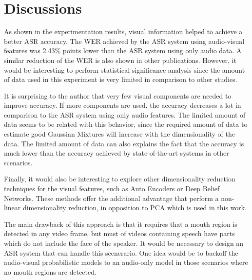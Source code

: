\documentclass[12pt,a4paper]{article}
\begin{document}
\section{Discussions}
As shown in the experimentation results, visual information helped to achieve a better ASR accuracy. The WER achieved by the ASR system using audio-visual features was 2.43\% points lower than the ASR system using only audio data. A similar reduction of the WER is also shown in other publications\cite{neti2000audio, dupont2000audio, hazen2004segment}. However, it would be interesting to perform statistical significance analysis since the amount of data used in this experiment is very limited in comparison to other studies.

It is surprising to the author that very few visual components are needed to improve accuracy. If more components are used, the accuracy decreases a lot in comparison to the ASR system using only audio features. The limited amount of data seems to be related with this behavior, since the required amount of data to estimate good Gaussian Mixtures will increase with the dimensionality of the data. The limited amount of data can also explains the fact that the accuracy is much lower than the accuracy achieved by state-of-the-art systems in other scenarios.

Finally, it would also be interesting to explore other dimensionality reduction techniques for the visual features, such as Auto Encoders or Deep Belief Networks\cite{hinton2006reducing}. These methods offer the additional advantage that perform a non-linear dimensionality reduction, in opposition to PCA which is used in this work.

The main drawback of this approach is that it requires that a mouth region is detected in any video frame, but must of videos containing speech have parts which do not include the face of the speaker. It would be necessary to design an ASR system that can handle this scenerario. One idea would be to backoff the audio-visual probabilistic models to an audio-only model in those scenarios where no mouth regions are detected.

 

\end{document}
